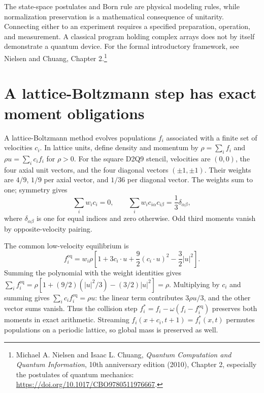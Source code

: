 The state-space postulates and Born rule are physical modeling rules, while
normalization preservation is a mathematical consequence of unitarity.
Connecting either to an experiment requires a specified preparation, operation,
and measurement. A classical program holding complex arrays does not by
itself demonstrate a quantum device. For the formal introductory framework,
see Nielsen and Chuang, Chapter 2.\footnote{Michael A. Nielsen and Isaac L.
Chuang, \emph{Quantum Computation and Quantum Information}, 10th anniversary
edition (2010), Chapter 2, especially the postulates of quantum mechanics:
\url{https://doi.org/10.1017/CBO9780511976667}.}



\section{A lattice-Boltzmann step has exact moment obligations}
\label{learn:fluids}

A lattice-Boltzmann method evolves populations $f_i$ associated with a finite
set of velocities $c_i$. In lattice units, define density and momentum by
$\rho=\sum_i f_i$ and $\rho u=\sum_i c_i f_i$ for $\rho>0$.
For the square D2Q9 stencil, velocities are $(0,0)$, the four axial unit
vectors, and the four diagonal vectors $(\pm1,\pm1)$. Their weights are
$4/9$, $1/9$ per axial vector, and $1/36$ per diagonal vector.
The weights sum to one; symmetry gives
\[
 \sum_iw_ic_i=0,\qquad
 \sum_iw_i c_{i\alpha}c_{i\beta}=\frac13\delta_{\alpha\beta},
\]
where $\delta_{\alpha\beta}$ is one for equal indices and zero otherwise.
Odd third moments vanish by opposite-velocity pairing.

The common low-velocity equilibrium is
\[
 f_i^{\mathrm{eq}}=w_i\rho\left[
 1+3c_i\cdot u+\frac92(c_i\cdot u)^2-\frac32|u|^2\right].
\]
Summing the polynomial with the weight identities gives
$\sum_i f_i^{\mathrm{eq}}=\rho[1+(9/2)(|u|^2/3)-(3/2)|u|^2]=\rho$.
Multiplying by $c_i$ and summing gives $\sum_i c_if_i^{\mathrm{eq}}=\rho u$:
the linear term contributes $3\rho u/3$, and the other vector sums vanish.
Thus the collision step
$f_i^*=f_i-\omega(f_i-f_i^{\mathrm{eq}})$ preserves both moments in exact
arithmetic. Streaming $f_i(x+c_i,t+1)=f_i^*(x,t)$ permutes populations on a
periodic lattice, so global mass is preserved as well.

